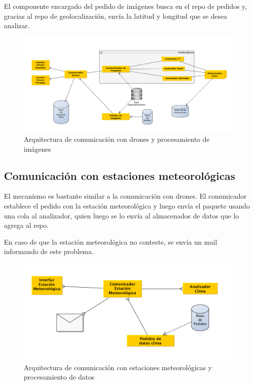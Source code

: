 El componente encargado del pedido de im\'agenes busca en el repo de pedidos y, gracias al repo de geolocalizaci\'on, env\'ia la latitud y longitud que se desea analizar.

\begin{figure}[h!]
  \centering
  \includegraphics[width=1\textwidth]{./images/arq_drones.png}
  \caption{Arquitectura de comunicaci\'on con drones y procesamiento de im\'agenes}
  \label{fig:clases4}
\end{figure}

\subsection{Comunicaci\'on con estaciones meteorol\'ogicas}

El mecanismo es bastante similar a la comunicaci\'on con drones. El comunicador establece el pedido con la estaci\'on meteorol\'ogica y luego env\'ia el paquete usando una cola al analizador, quien luego se lo env\'ia al almacenados de datos que lo agrega al repo.

En caso de que la estaci\'on meteorol\'ogica no conteste, se env\'ia un mail informando de este problema.

\begin{figure}[h!]
  \centering
  \includegraphics[width=1\textwidth]{./images/arq_clima.png}
  \caption{Arquitectura de comunicaci\'on con estaciones meteorol\'ogicas y procesamiento de datos}
  \label{fig:clases4}
\end{figure}



